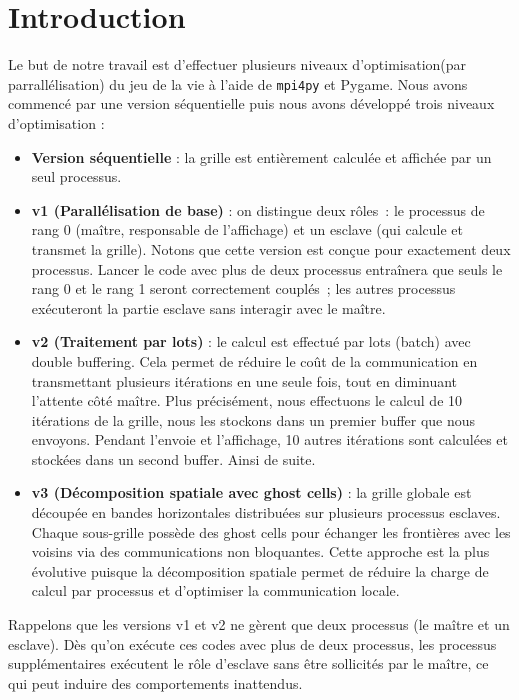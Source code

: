 \documentclass[a4paper,13pt]{book}
\author{\bsc{DADA SIMEU Cédric Darel}}
\begin{document}
	
\tableofcontents
\listoffigures
\newpage
\section{Introduction}

Le but de notre travail est d'effectuer plusieurs niveaux d'optimisation(par parrallélisation) du jeu de la vie à l'aide de \texttt{mpi4py} et Pygame. Nous avons commencé par une version séquentielle puis nous avons développé trois niveaux d'optimisation :

\begin{itemize}
  \item \textbf{Version séquentielle} : la grille est entièrement calculée et affichée par un seul processus.
  \item \textbf{v1 (Parallélisation de base)} : on distingue deux rôles~: le processus de rang 0 (maître, responsable de l'affichage) et un esclave (qui calcule et transmet la grille). Notons que cette version est conçue pour exactement deux processus. Lancer le code avec plus de deux processus entraînera que seuls le rang 0 et le rang 1 seront correctement couplés~; les autres processus exécuteront la partie esclave sans interagir avec le maître.
  \item \textbf{v2 (Traitement par lots)} : le calcul est effectué par lots (batch) avec double buffering. Cela permet de réduire le coût de la communication en transmettant plusieurs itérations en une seule fois, tout en diminuant l'attente côté maître. Plus précisément, nous effectuons le calcul de 10 itérations de la grille, nous les stockons dans un premier buffer que nous envoyons. Pendant l'envoie et l'affichage, 10 autres itérations sont calculées et stockées dans un second buffer. Ainsi de suite.
  \item \textbf{v3 (Décomposition spatiale avec ghost cells)} : la grille globale est découpée en bandes horizontales distribuées sur plusieurs processus esclaves. Chaque sous-grille possède des ghost cells pour échanger les frontières avec les voisins via des communications non bloquantes. Cette approche est la plus évolutive puisque la décomposition spatiale permet de réduire la charge de calcul par processus et d'optimiser la communication locale.
\end{itemize}

\noindent
Rappelons que les versions v1 et v2 ne gèrent que deux processus (le maître et un esclave). Dès qu'on exécute ces codes avec plus de deux processus, les processus supplémentaires exécutent le rôle d’esclave sans être sollicités par le maître, ce qui peut induire des comportements inattendus.
\end{document}
